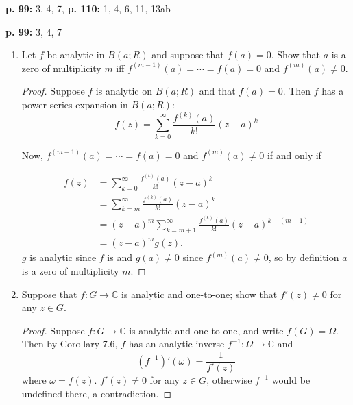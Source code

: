 \documentclass[11pt,oneside,english]{amsart}
\theoremstyle{definition}
\newcommand{\lspace}{\vspace{5mm}}
\newcommand{\MB}[1]{\mathbb{#1}}
\begin{document}
\rightline{\today}

\lspace



\textbf{p. 99:} 3, 4, 7, \textbf{p. 110:} 1, 4, 6, 11, 13ab

\lspace

\textbf{p. 99:} 3, 4, 7

\begin{enumerate}[leftmargin=*]
\itemsep5mm

\setcounter{enumi}{2}

\item Let $f$ be analytic in $B(a;R)$ and suppose that $f(a)=0$. Show that $a$ is a zero of multiplicity $m$ iff $f^{(m-1)}(a)=\cdots=f(a)=0$ and $f^{(m)}(a)\neq0$.

\begin{proof}
Suppose $f$ is analytic on $B(a;R)$ and that $f(a)=0$. Then $f$ has a power series expansion in $B(a;R)$:
\[
f(z)=\sum_{k=0}^\infty \frac{f^{(k)}(a)}{k!}(z-a)^k
\]

Now, $f^{(m-1)}(a)=\cdots=f(a)=0$ and $f^{(m)}(a)\neq0$ if and only if

\begin{align*}
f(z)&=\sum_{k=0}^\infty \frac{f^{(k)}(a)}{k!}(z-a)^k\\[2mm]
&=\sum_{k=m}^\infty \frac{f^{(k)}(a)}{k!}(z-a)^k\\[2mm]
&=(z-a)^m \sum_{k=m+1}^\infty \frac{f^{(k)}(a)}{k!}(z-a)^{k-(m+1)}\\[2mm]
&=(z-a)^mg(z).
\end{align*}
$g$ is analytic since $f$ is and $g(a)\neq0$ since $f^{(m)}(a)\neq0$, so by definition $a$ is a zero of multiplicity $m$.
\end{proof}

\pagebreak

\item Suppose that $f:G\to \MB{C}$ is analytic and one-to-one; show that $f'(z)\neq 0$ for any $z\in G$.

\begin{proof}
Suppose $f:G\to \MB{C}$ is analytic and one-to-one, and write $f(G)=\Omega$. Then by Corollary 7.6, $f$ has an analytic inverse $f^{-1}:\Omega\to\MB{C}$ and 
\[
(f^{-1})'(\omega)=\frac{1}{f'(z)}
\]
where $\omega=f(z)$. $f'(z)\neq0$ for any $z\in G$, otherwise $f^{-1}$ would be undefined there, a contradiction.
\end{proof}



\end{enumerate}
\end{document}
